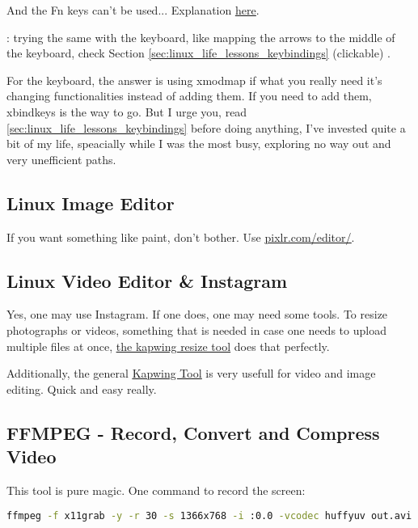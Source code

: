     And the Fn keys can't be used... Explanation \href{https://www.reddit.com/r/i3wm/comments/5jm408/xev_doesnt_see_my_fn_key/}{\ul{here}}.

    : trying the same with the keyboard, like mapping the arrows to the middle of the keyboard, check Section \ref{sec:linux_life_lessons_keybindings} (clickable) .
    
    
\vspace{.5cm}
\par For the keyboard, the answer is using xmodmap if what you really need it's changing functionalities instead of adding them. If you need to add them, xbindkeys is the way to go. 
But I urge you, read \ref{sec:linux_life_lessons_keybindings} before doing anything, I've invested quite a bit of my life, speacially while I was the most busy, exploring no way out and very unefficient paths.







\subsection{Linux Image Editor}
\par If you want something like paint, don't bother. Use \href{https://pixlr.com/editor/}{\ul{pixlr.com/editor/}}.


\subsection{Linux Video Editor \& Instagram}
Yes, one may use Instagram. If one does, one may need some tools.
To resize photographs or videos, something that is needed in case one needs to upload multiple files at once, \href{https://www.kapwing.com/resize-video}{\ul{the kapwing resize tool}} does that perfectly.


Additionally, the general \href{https://www.kapwing.com/workspace}{\ul{Kapwing Tool}} is very usefull for video and image editing. Quick and easy really.




\subsection{FFMPEG - Record, Convert and Compress Video}
This tool is pure magic.
One command to record the screen:
\begin{lstlisting}[language=bash]
    ffmpeg -f x11grab -y -r 30 -s 1366x768 -i :0.0 -vcodec huffyuv out.avi
\end{lstlisting}

